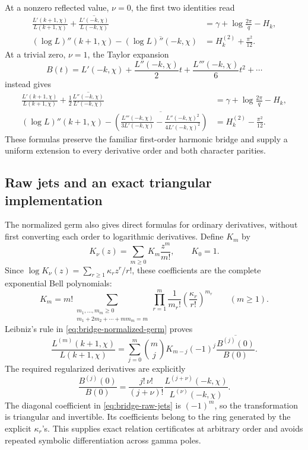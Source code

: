 At a nonzero reflected value, \(\nu=0\), the first two identities
read
\begin{align}
 \frac{L'(k+1,\chi)}{L(k+1,\chi)}
 +\overline{\frac{L'(-k,\chi)}{L(-k,\chi)}}
 &=\gamma+\log\frac{2\pi}{q}-H_k,
 \label{eq:bridge-first-nonzero}\\
 (\log L)''(k+1,\chi)
 -\overline{(\log L)''(-k,\chi)}
 &=H_k^{(2)}+\frac{\pi^2}{12}.
 \label{eq:bridge-second-nonzero}
\end{align}
At a trivial zero, \(\nu=1\), the Taylor expansion
\[
 B(t)=L'(-k,\chi)
   +\frac{L''(-k,\chi)}2t
   +\frac{L'''(-k,\chi)}6t^2+\cdots
\]
instead gives
\begin{align}
 \frac{L'(k+1,\chi)}{L(k+1,\chi)}
 +\frac12\overline{\frac{L''(-k,\chi)}{L'(-k,\chi)}}
 &=\gamma+\log\frac{2\pi}{q}-H_k,
 \label{eq:bridge-first-zero}\\
 (\log L)''(k+1,\chi)
 -\overline{\left(
    \frac{L'''(-k,\chi)}{3L'(-k,\chi)}
   -\frac{L''(-k,\chi)^2}{4L'(-k,\chi)^2}
   \right)}
 &=H_k^{(2)}-\frac{\pi^2}{12}.
 \label{eq:bridge-second-zero}
\end{align}
These formulas preserve the familiar first-order harmonic
bridge and supply a uniform extension to every derivative
order and both character parities.

\subsection{Raw jets and an exact triangular implementation}

The normalized germ also gives direct formulas for ordinary
derivatives, without first converting each order to logarithmic
derivatives. Define \(K_m\) by
\[
 K_\nu(z)=\sum_{m\geq0}K_m\frac{z^m}{m!},\qquad K_0=1.
\]
Since \(\log K_\nu(z)=\sum_{r\geq1}\kappa_rz^r/r!\),
these coefficients are the complete exponential Bell polynomials:
\begin{equation}
 K_m=
 m!\!\!\sum_{\substack{m_1,\ldots,m_m\geq0\\
                     m_1+2m_2+\cdots+mm_m=m}}
 \prod_{r=1}^{m}\frac1{m_r!}
       \left(\frac{\kappa_r}{r!}\right)^{m_r}
 \qquad(m\geq1).
 \label{eq:bridge-bell-coefficients}
\end{equation}
Leibniz's rule in \eqref{eq:bridge-normalized-germ} proves
\begin{equation}
 \frac{L^{(m)}(k+1,\chi)}{L(k+1,\chi)}
 =
 \sum_{j=0}^{m}\binom mj K_{m-j}(-1)^j
       \overline{\frac{B^{(j)}(0)}{B(0)}}.
 \label{eq:bridge-raw-jets}
\end{equation}
The required regularized derivatives are explicitly
\begin{equation}
 \frac{B^{(j)}(0)}{B(0)}
 =\frac{j!\,\nu!}{(j+\nu)!}
    \frac{L^{(j+\nu)}(-k,\chi)}{L^{(\nu)}(-k,\chi)}.
 \label{eq:bridge-regularized-raw-jets}
\end{equation}
The diagonal coefficient in
\eqref{eq:bridge-raw-jets} is \((-1)^m\), so the transformation
is triangular and invertible. Its coefficients belong to the
ring generated by the explicit \(\kappa_r\)'s. This supplies
exact relation certificates at arbitrary order and avoids
repeated symbolic differentiation across gamma poles.

